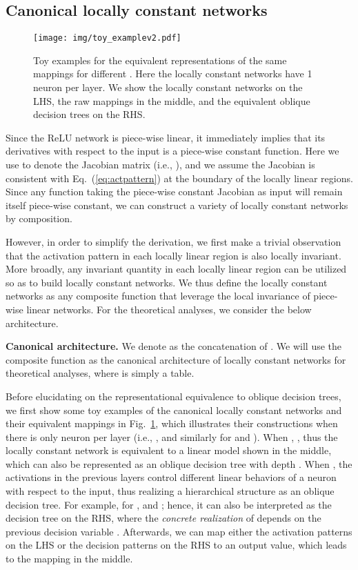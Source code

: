 \documentclass{article} \usepackage{iclr2020_conference,times}
\begin{document}
\subsection{Canonical locally constant networks}\label{sec:lcn}
\begin{figure}
\vspace{-2mm}
\centering
\texttt{[image: img/toy\_examplev2.pdf]}
	\caption{Toy examples for the equivalent representations of the same mappings for different . Here the locally constant networks have 1 neuron per layer. We show the locally constant networks on the LHS, the raw mappings in the middle, and the equivalent oblique decision trees on the RHS.\!\!\!\!\!}\label{fig:toy_example}
    \vspace{-3mm}
\end{figure}

Since the ReLU network  is piece-wise linear, it immediately implies that its derivatives with respect to the input  is a piece-wise constant function. Here we use  to denote the Jacobian matrix (i.e., ), and we assume the Jacobian is consistent with Eq.~(\ref{eq:actpattern}) at the boundary of the locally linear regions. Since any function taking the piece-wise constant Jacobian as input will remain itself piece-wise constant, we can construct a variety of locally constant networks by composition.

However, in order to simplify the derivation, we first make a trivial observation that the activation pattern in each locally linear region is also locally invariant. More broadly, any invariant quantity in each locally linear region can be utilized so as to build locally constant networks. We thus define the locally constant networks as any composite function that leverage the local invariance of piece-wise linear networks. For the theoretical analyses, we consider the below architecture.

\textbf{Canonical architecture.} We denote  as the concatenation of .
We will use the composite function  as the canonical architecture of locally constant networks for theoretical analyses, where  is simply a table.


Before elucidating on the representational equivalence to oblique decision trees, we first show some toy examples of the canonical locally constant networks and their equivalent mappings in Fig.~\ref{fig:toy_example}, which illustrates their constructions when there is only  neuron per layer (i.e., , and similarly for  and ). When , , thus the locally constant network is equivalent to a linear model shown in the middle, which can also be represented as an oblique decision tree with depth . When , the activations in the previous layers control different linear behaviors of a neuron with respect to the input, thus realizing a hierarchical structure as an oblique decision tree. For example, for ,  and ; hence, it can also be interpreted as the decision tree on the RHS, where the \emph{concrete realization} of  depends on the previous decision variable . Afterwards, we can map either the activation patterns on the LHS or the decision patterns on the RHS to an output value, which leads to the mapping in the middle.  \vspace{-1mm}
\end{document}
